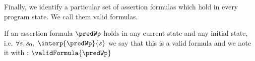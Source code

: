   



%




 
Finally, we identify  a particular set of assertion formulas which  hold in every program state. We call them  valid formulas. 
\begin{interpretation}\label{assertLang:interpretation:valid}
  If an assertion formula  $ \predWp $ holds in any current state and any initial state, i.e.
$\forall s, s_{0}, \  \interp{\predWp}{s} $ we say that this is a valid formula and we note it with :
  $\validFormula{\predWp} $ 
\end{interpretation}
